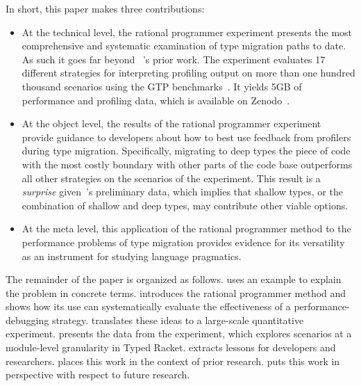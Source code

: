 In short, this paper makes three contributions:
\begin{itemize}

\item At the technical level, the rational programmer experiment presents
  the most comprehensive and systematic examination of type migration
    paths to date.    As such it goes far beyond ~\citet{g-deep-shallow}'s 
    prior work.  The experiment evaluates 17 different strategies for
    interpreting profiling output on  more than one hundred thousand scenarios using the GTP
    benchmarks~\cite{g-rep-2023}. It yields
     5GB of performance and profiling data, which
    is available on
    Zenodo~\cite{gdf-artifact-2023}.
  
\item At the object level, the results of the rational programmer
  experiment provide guidance to developers about how to best use feedback
    from profilers during type migration. Specifically, 
    migrating to deep types the piece of code with the most costly
    boundary with other parts of the code base
    outperforms all other  strategies on the scenarios of
    the experiment. This result is a \emph{surprise} given~\citet{g-deep-shallow}'s
    preliminary data, which implies that shallow types, or the combination of shallow and deep
    types, may contribute other viable options. 

\item At the meta level, this application of the rational programmer method to
 the performance problems of type migration provides evidence for its versatility
 as an instrument for studying language pragmatics.

\end{itemize}
The remainder of the paper is organized as follows.  
uses an example to explain the problem in concrete terms. 
introduces the rational programmer method and shows how its use can systematically
evaluate the effectiveness of a performance-debugging strategy.
 translates these ideas to a
large-scale quantitative experiment.
 presents the data from the experiment, which
explores scenarios at a module-level granularity in Typed Racket.
 extracts lessons for developers and researchers.
 places this work in the context of prior research.
 puts this work in perspective with respect to future
research.
